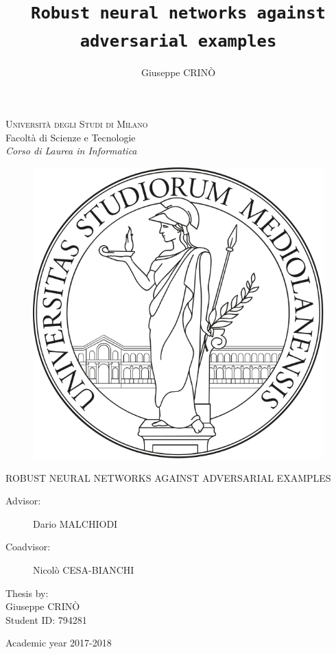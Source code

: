 \documentclass{mimosis}
\title{\texttt{Robust neural networks against adversarial examples}}
\author{Giuseppe CRIN\`O}
\begin{document}
\frontmatter
  \begin{titlepage}
  \begin{center}
      \Large
      \textsc{Universit\`a degli Studi di Milano} \\
      Facolt\`a di Scienze e Tecnologie \\
      \emph{Corso di Laurea in Informatica}
  \end{center}
  \begin{figure}[H]
    \centering
    \includegraphics[width=0.5\linewidth]{Images/logo-unimi.png}
  \end{figure}
	\begin{center}
		\Large ROBUST NEURAL NETWORKS AGAINST ADVERSARIAL EXAMPLES
	\end{center}
	\vfill
  \begin{description}
  \item[Advisor:] Dario MALCHIODI
  \item[Coadvisor:] Nicol\`o CESA-BIANCHI
  \end{description}
        \null\hfill
        \parbox{3in} {
          Thesis by: \\
          \expandafter{Giuseppe CRIN\`O} \\ 
          Student ID: 794281
        }
        \vfill
	\begin{center}
    \Large Academic year 2017-2018
  \end{center}
  \end{titlepage}

  \newpage
  \null
  \thispagestyle{empty}
  \newpage

  \tableofcontents

\mainmatter

  
  
  
  
  

\backmatter

  \printbibliography[heading=bibintoc,title={References}]
\end{document}
